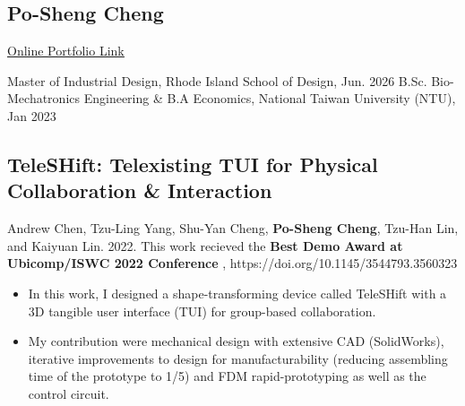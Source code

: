 \documentclass[12pt]{article}
\begin{document}
\begin{multicols}{2}
    \section*{Po-Sheng Cheng}
    \href{https://bencer3283.github.io/art/}{\underline{Online Portfolio Link}}
    
    \columnbreak
    {\sffamily \noindent
    Master of Industrial Design, Rhode Island School of Design, Jun. 2026 \newline
    B.Sc. Bio-Mechatronics Engineering \& \newline B.A Economics, National Taiwan University (NTU), Jan 2023
    }
\end{multicols}
        \subsection*{TeleSHift: Telexisting TUI for Physical Collaboration \& Interaction}
        {\sffamily
        {\footnotesize Andrew Chen, Tzu-Ling Yang, Shu-Yan Cheng, \textbf{Po-Sheng Cheng}, Tzu-Han Lin, and Kaiyuan Lin. 2022. This work recieved the \textbf{Best Demo Award at Ubicomp/ISWC 2022 Conference}%
        , https://doi.org/10.1145/3544793.3560323}
        \begin{itemize}
            \item In this work, I designed a shape-transforming device called TeleSHift with a 3D tangible user interface (TUI) for group-based collaboration.
            \item My contribution were mechanical design with extensive CAD (SolidWorks), iterative improvements to design for manufacturability (reducing assembling time of the prototype to 1/5) and FDM rapid-prototyping as well as the control circuit.
        \end{itemize}
        }
\end{document}
